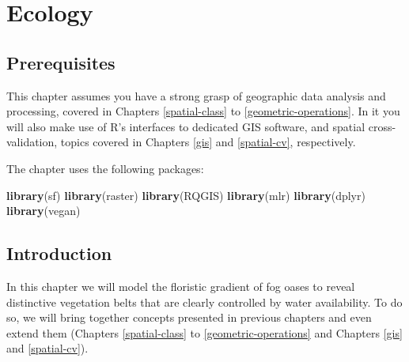 \documentclass[]{krantz}
\newenvironment{Shaded}{\begin{snugshade}}{\end{snugshade}}
\newcommand{\KeywordTok}[1]{\textcolor[rgb]{0.27,0.27,0.27}{\textbf{#1}}}
\newcommand{\NormalTok}[1]{#1}
\begin{document}
\hypertarget{eco}{%
\section{Ecology}\label{eco}}

\hypertarget{prerequisites-12}{%
\subsection*{Prerequisites}\label{prerequisites-12}}

This chapter assumes you have a strong grasp of geographic data analysis and processing, covered in Chapters \ref{spatial-class} to \ref{geometric-operations}.
In it you will also make use of R's interfaces to dedicated GIS software, and spatial cross-validation, topics covered in Chapters \ref{gis} and \ref{spatial-cv}, respectively.

The chapter uses the following packages:

\begin{Shaded}
\begin{Highlighting}[]
\KeywordTok{library}\NormalTok{(sf)}
\KeywordTok{library}\NormalTok{(raster)}
\KeywordTok{library}\NormalTok{(RQGIS)}
\KeywordTok{library}\NormalTok{(mlr)}
\KeywordTok{library}\NormalTok{(dplyr)}
\KeywordTok{library}\NormalTok{(vegan)}
\end{Highlighting}
\end{Shaded}

\hypertarget{introduction-9}{%
\subsection{Introduction}\label{introduction-9}}

In this chapter we will model the floristic gradient of fog oases to reveal distinctive vegetation belts that are clearly controlled by water availability.
To do so, we will bring together concepts presented in previous chapters and even extend them (Chapters \ref{spatial-class} to \ref{geometric-operations} and Chapters \ref{gis} and \ref{spatial-cv}).
\end{document}
